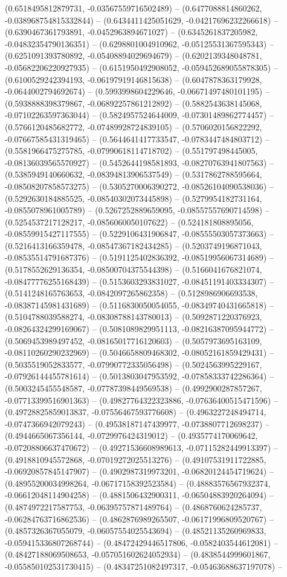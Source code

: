 (0.6518495812879731, -0.03567559716502489) -- (0.6477088814860262, -0.038968754815332844) -- (0.6434411425051629, -0.04217696232266618) -- (0.6390467361793891, -0.0452963894671027) -- (0.6345261837205982, -0.04832354790136351) -- (0.6298801004910962, -0.05125531367595343) -- (0.6251091393780892, -0.05408894029694679) -- (0.6202139348048781, -0.05682206220927935) -- (0.6151950492908052, -0.059452689055878305) -- (0.6100529242394193, -0.06197919146815638) -- (0.6047878363179928, -0.0644002794692674) -- (0.5993998604229646, -0.06671497480101195) -- (0.5938888398379867, -0.06892257861212892) -- (0.5882543638145068, -0.07102263597363044) -- (0.5824957524644009, -0.07301489862774457) -- (0.5766120485682772, -0.07489928724839105) -- (0.5706020156822292, -0.07667585431319465) -- (0.5644641417733547, -0.0783447484803712) -- (0.5581966475275785, -0.07990618114718702) -- (0.551797498445005, -0.08136039565570927) -- (0.5452644198581893, -0.08270763941807563) -- (0.5385949140660632, -0.08394813906537549) -- (0.5317862788595664, -0.08508207858573275) -- (0.5305270006390272, -0.08526104090538036) -- (0.5292630184885525, -0.08540302073445898) -- (0.5279954182731164, -0.0855078961005789) -- (0.5267252889659095, -0.08557557690714598) -- (0.5254537217128217, -0.0856060050107622) -- (0.524181808895056, -0.08559915427117555) -- (0.5229106431906847, -0.08555503057373663) -- (0.5216413166359478, -0.08547367182434285) -- (0.5203749196871043, -0.08535514791687376) -- (0.5191125402836392, -0.08519956067314689) -- (0.5178552629136354, -0.08500704375544398) -- (0.5166041676821074, -0.08477776255168439) -- (0.5153603293831027, -0.08451191403334307) -- (0.5141248165763653, -0.0842097265862358) -- (0.5128986906693538, -0.08387145981431689) -- (0.5116830050054055, -0.08349740431665818) -- (0.5104788039588274, -0.08308788143780013) -- (0.5092871220376923, -0.08264324299169067) -- (0.5081089829951113, -0.08216387095944772) -- (0.5069453989497452, -0.08165017716120603) -- (0.5057973695163109, -0.08110260290232969) -- (0.5046658809468302, -0.08052161859429431) -- (0.5035519052833577, -0.07990772335056498) -- (0.5024563995229167, -0.07926144455781614) -- (0.5013803047953592, -0.07858333742286364) -- (0.5003245455548587, -0.07787398449569538) -- (0.4992900287857267, -0.07713399516901363) -- (0.49827764322323886, -0.07636400515471596) -- (0.49728825859013837, -0.07556467593776608) -- (0.4963227248494714, -0.0747366942079243) -- (0.49538187147439977, -0.0738807712698237) -- (0.4944665067356144, -0.0729976424319012) -- (0.4935774170069642, -0.07208806637470672) -- (0.49271536608989613, -0.07115282449913397) -- (0.4918810945572868, -0.07019272025513276) -- (0.49107531911722885, -0.06920857845147907) -- (0.4902987319973201, -0.06820124454719624) -- (0.48955200034998264, -0.06717158392523584) -- (0.48883576567932374, -0.06612048114904258) -- (0.4881506432900311, -0.06504883920264094) -- (0.4874972217587753, -0.06395757871489764) -- (0.4868760624285737, -0.06284763716862536) -- (0.4862876989265507, -0.06171996809520767) -- (0.4857326367055079, -0.06057554025543694) -- (0.48521135260969833, -0.059415336807268744) -- (0.48472429446517806, -0.0582403544612081) -- (0.48427188069508653, -0.057051602624052934) -- (0.4838544999601867, -0.055850102531730415) -- (0.48347251082497317, -0.05463688637197078) -- 